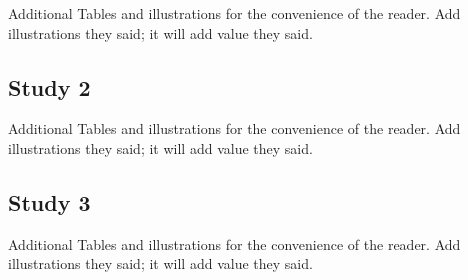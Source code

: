 \documentclass[
  man]{apa6}
\begin{document}
Additional Tables and illustrations for the convenience of the reader. Add illustrations they said; it will add value they said.

\subsection{Study 2}\label{study-2-3}

Additional Tables and illustrations for the convenience of the reader. Add illustrations they said; it will add value they said.

\subsection{Study 3}\label{study-3-3}

Additional Tables and illustrations for the convenience of the reader. Add illustrations they said; it will add value they said.
\end{document}
